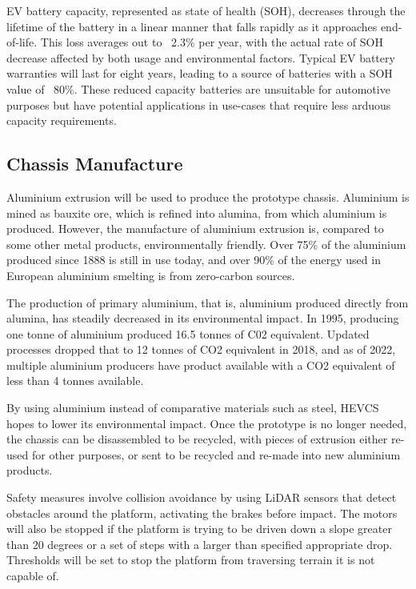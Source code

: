 \documentclass [12pt]{article}
\begin{document}
EV battery capacity, represented as state of health (SOH), decreases through the lifetime of the battery in a linear manner that falls rapidly as it approaches end-of-life. This loss averages out to ~2.3\% per year, with the actual rate of SOH decrease affected by both usage and environmental factors\cite{EV_Battery_Health}. Typical EV battery warranties will last for eight years, leading to a source of batteries with a SOH value of ~80\%\cite{EV_Battery_Longevity}. These reduced capacity batteries are unsuitable for automotive purposes but have potential applications in use-cases that require less arduous capacity requirements.

\subsection{Chassis Manufacture}
Aluminium extrusion will be used to produce the prototype chassis. Aluminium is mined as bauxite ore, which is refined into alumina, from which aluminium is produced. However, the manufacture of aluminium extrusion is, compared to some other metal products, environmentally friendly. Over 75\% of the aluminium produced since 1888 is still in use today, and over 90\% of the energy used in European aluminium smelting is from zero-carbon sources.

The production of primary aluminium, that is, aluminium produced directly from alumina, has steadily decreased in its environmental impact. In 1995, producing one tonne of aluminium produced 16.5 tonnes of C02 equivalent. Updated processes dropped that to 12 tonnes of CO2 equivalent in 2018, and as of 2022, multiple aluminium producers have product available with a CO2 equivalent of less than 4 tonnes available\cite{Al_Manufac}.

By using aluminium instead of comparative materials such as steel, HEVCS hopes to lower its environmental impact. Once the prototype is no longer needed, the chassis can be disassembled to be recycled, with pieces of extrusion either re-used for other purposes, or sent to be recycled and re-made into new aluminium products.


Safety measures involve collision avoidance by using LiDAR sensors that detect obstacles around the platform, activating the brakes before impact.
The motors will also be stopped if the platform is trying to be driven down a slope greater than 20 degrees or a set of steps with a larger  than specified appropriate drop.
Thresholds will be set to stop the platform from traversing terrain it is not capable of.
\end{document}
